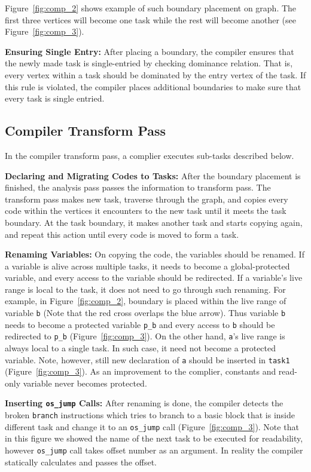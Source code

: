 Figure~\ref{fig:comp_2} shows example of such boundary placement on graph. The first three vertices will become one task while the rest will become another (see Figure~\ref{fig:comp_3}).

\textbf{Ensuring Single Entry:} After placing a boundary, the compiler ensures that the newly made task is single-entried by checking dominance relation. That is, every vertex within a task should be dominated by the entry vertex of the task. If this rule is violated, the compiler places additional boundaries to make sure that every task is single entried.

\subsection{Compiler Transform Pass}
\label{sec:compiler_transform_pass}

In the compiler transform pass, a complier executes sub-tasks described below.

\textbf{Declaring and Migrating Codes to Tasks:} After the boundary placement is finished, the analysis pass passes the information to transform pass. The transform pass makes new task, traverse through the graph, and copies every code within the vertices it encounters to the new task until it meets the task boundary. At the task boundary, it makes another task and starts copying again, and repeat this action until every code is moved to form a task.

\textbf{Renaming Variables:} On copying the code, the variables should be renamed. If a variable is alive across multiple tasks, it needs to become a global-protected variable, and every access to the variable should be redirected. If a variable's live range is local to the task, it does not need to go through such renaming. For example, in Figure~\ref{fig:comp_2}, boundary is placed within the live range of variable {\tt b} (Note that the red cross overlaps the blue arrow). Thus variable {\tt b} needs to become a protected variable {\tt p\_b} and every access to {\tt b} should be redirected to {\tt p\_b} (Figure~\ref{fig:comp_3}). On the other hand, {\tt a}'s live range is always local to a single task. In such case, it need not become a protected variable. Note, however, still new declaration of {\tt a} should be inserted in {\tt task1} (Figure~\ref{fig:comp_3}). As an improvement to the complier, constants and read-only variable never becomes protected.

\textbf{Inserting \texttt{os\_jump} Calls:} After renaming is done, the compiler detects the broken {\tt branch} instructions which tries to branch to a basic block that is inside different task and change it to an {\tt os\_jump} call (Figure~\ref{fig:comp_3}).  Note that in this figure we showed the name of the next task to be executed for readability, however {\tt os\_jump} call takes offset number as an argument. In reality the compiler statically calculates and passes the offset.

